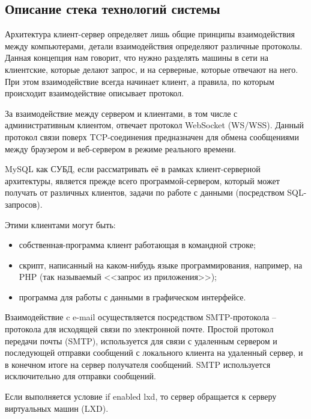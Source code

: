 \subsection{Описание стека технологий системы}
Архитектура клиент-сервер определяет лишь общие принципы взаимодействия между компьютерами, детали взаимодействия определяют различные протоколы. Данная концепция нам говорит, что нужно разделять машины в сети на клиентские, которые делают запрос, и на серверные, которые отвечают на него. При этом взаимодействие всегда начинает клиент, а правила, по которым происходит взаимодействие описывает протокол.\par
За взаимодействие между сервером и клиентами, в том числе с административным клиентом, отвечает протокол WebSocket (WS/WSS). Данный протокол связи поверх TCP-соединения предназначен для обмена сообщениями между браузером и веб-сервером в режиме реального времени.\par
MySQL как СУБД, если рассматривать её в рамках клиент-серверной архитектуры, является прежде всего программой-сервером, который может получать от различных клиентов, задачи по работе с данными (посредством SQL-запросов).\par 
Этими клиентами могут быть:
\begin{itemize}
\item собственная-программа клиент работающая в командной строке;
\item скрипт, написанный на каком-нибудь языке программирования, например, на PHP (так называемый <<запрос из приложения>>);
\item программа для работы с данными в графическом интерфейсе.\par
\end{itemize}
\vspace{\baselineskip}

Взаимодействие c e-mail осуществляется посредством SMTP-протокола -- протокола для исходящей связи по электронной почте. Простой протокол передачи почты (SMTP), используется для связи с удаленным сервером и последующей отправки сообщений с локального клиента на удаленный сервер, и в конечном итоге на сервер получателя сообщений. SMTP используется исключительно для отправки сообщений.\par
Если выполняется условие if enabled lxd, то сервер обращается к серверу виртуальных машин (LXD).\par
\vspace{\baselineskip}

